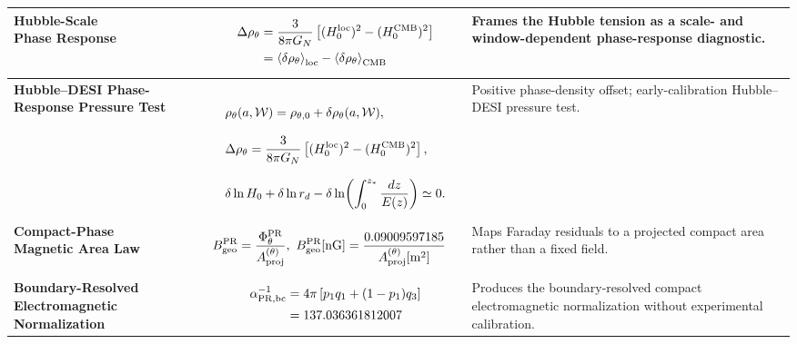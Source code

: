 \documentclass[11pt]{article}
\begin{document}
\begin{table}[ht!]
\begin{tabular}{p{3.8cm} p{6.2cm} p{5.5cm}}
\raggedright \textbf{Hubble-Scale\\Phase Response} & 
\vspace{-1.2em} \begin{equation*} 
\begin{aligned}
\Delta\rho_\theta &= \frac{3}{8\pi G_N} \left[(H_0^{\rm loc})^2 - (H_0^{\rm CMB})^2 \right] \\
&= \left\langle\delta\rho_\theta\right\rangle_{\rm loc} - \left\langle\delta\rho_\theta\right\rangle_{\rm CMB}
\end{aligned}
\end{equation*} & 
Frames the Hubble tension as a scale- and window-dependent phase-response diagnostic. \\ \hline

\raggedright \textbf{Hubble--DESI Phase-Response Pressure Test} &\
\vspace{-1.2em} \begin{equation*} 
\begin{aligned}
&\rho_\theta(a,\mathcal W) = \rho_{\theta,0} + \delta\rho_\theta(a,\mathcal W), \\[0.8em]
&\Delta\rho_\theta = \frac{3}{8\pi G_N} \left[ (H_0^{\rm loc})^2 - (H_0^{\rm CMB})^2 \right], \\[0.8em]
&\delta\ln H_0 + \delta\ln r_d - \delta\ln \!\left( \int_0^{z_*} \frac{dz}{E(z)} \right) \simeq 0.
\end{aligned}
\end{equation*} &
Positive phase-density offset; early-calibration Hubble--DESI pressure test.
\\ \hline

\raggedright \textbf{Compact-Phase\\Magnetic Area Law} & 
\vspace{-1.2em} \begin{equation*} 
\begin{aligned}
B_{\rm geo}^{\rm PR}
&=
\frac{\Phi_{\theta}^{\rm PR}}
     {A_{\rm proj}^{(\theta)}} ,\
B_{\rm geo}^{\rm PR}[{\rm nG}]
=\frac{0.09009597185}
     {A_{\rm proj}^{(\theta)}[{\rm m}^2]}
\end{aligned}
\end{equation*} & 
Maps Faraday residuals to a projected compact area rather than a fixed field. \\ \hline

\raggedright \textbf{Boundary-Resolved\\Electromagnetic Normalization} & 
\vspace{-1.2em} \begin{equation*} 
\begin{aligned}
\alpha_{\rm PR,bc}^{-1} &= 4\pi \left[ p_1 q_1 + (1-p_1)q_3 \right] \\
&= 137.036361812007
\end{aligned}
\end{equation*} & 
Produces the boundary-resolved compact electromagnetic normalization without experimental calibration. \\ \hline
\hline
\end{tabular}
\end{table}
\end{document}
